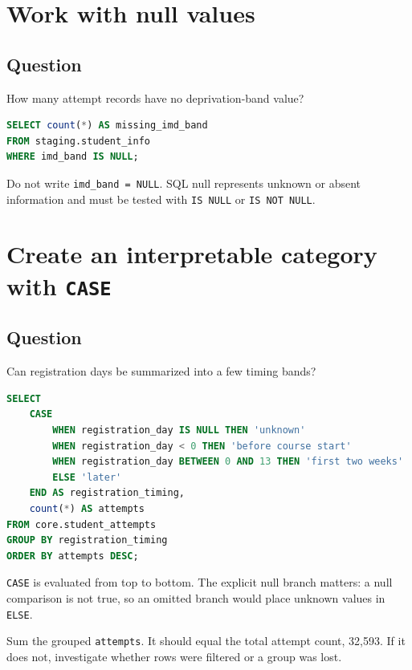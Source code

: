 \section{Work with null values}

\subsection{Question}
How many attempt records have no deprivation-band value?

\begin{lstlisting}[language=SQL]
SELECT count(*) AS missing_imd_band
FROM staging.student_info
WHERE imd_band IS NULL;
\end{lstlisting}


Do not write \texttt{imd\_band = NULL}. SQL null represents unknown or absent
information and must be tested with \texttt{IS NULL} or
\texttt{IS NOT NULL}.

\section{Create an interpretable category with \texttt{CASE}}

\subsection{Question}
Can registration days be summarized into a few timing bands?

\begin{lstlisting}[language=SQL,caption={Instructional categorical
transformation.}]
SELECT
    CASE
        WHEN registration_day IS NULL THEN 'unknown'
        WHEN registration_day < 0 THEN 'before course start'
        WHEN registration_day BETWEEN 0 AND 13 THEN 'first two weeks'
        ELSE 'later'
    END AS registration_timing,
    count(*) AS attempts
FROM core.student_attempts
GROUP BY registration_timing
ORDER BY attempts DESC;
\end{lstlisting}

\texttt{CASE} is evaluated from top to bottom. The explicit null branch matters:
a null comparison is not true, so an omitted branch would place unknown values
in \texttt{ELSE}.

\begin{validationbox}
Sum the grouped \texttt{attempts}. It should equal the total attempt count,
32,593. If it does not, investigate whether rows were filtered or a group was
lost.
\end{validationbox}

